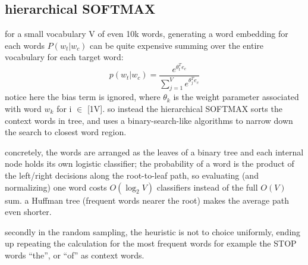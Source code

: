 \documentclass[4apaper,12pt]{book}
\begin{document}
\begin{description}
\begin{description}
\begin{description}
\begin{description}
              \subsection{hierarchical SOFTMAX}
              \begin{description}
              \item for a small vocabulary V of even 10k words, generating a word embedding for each words $P(w_t|w_c)$ can be quite expensive summing over the entire vocabulary for each target word: $$ p(w_t|w_c) = \frac{e^{\theta_t^Te_c}}{\sum_{j=1}^Ve^{\theta_j^Te_c}}$$ notice here the bias term is ignored, where $\theta_k$ is the weight parameter associated with word $w_k$ for i $\in$ [1\text{-}V]. so instead the hierarchical SOFTMAX sorts the context words in tree, and uses a binary-search-like algorithms to narrow down the search to closest word region.
              \item concretely, the words are arranged as the leaves of a binary tree and each internal node holds its own logistic classifier; the probability of a word is the product of the left/right decisions along the root-to-leaf path, so evaluating (and normalizing) one word costs $O(\log_2 V)$ classifiers instead of the full $O(V)$ sum. a Huffman tree (frequent words nearer the root) makes the average path even shorter.
              \item secondly in the random sampling, the heuristic is not to choice uniformly, ending up repeating the calculation for the most frequent words for example the STOP words ``the'', or ``of'' as context words.
                \end{description}
            \end{description}

\end{description}
\end{description}
\end{description}
\end{document}
